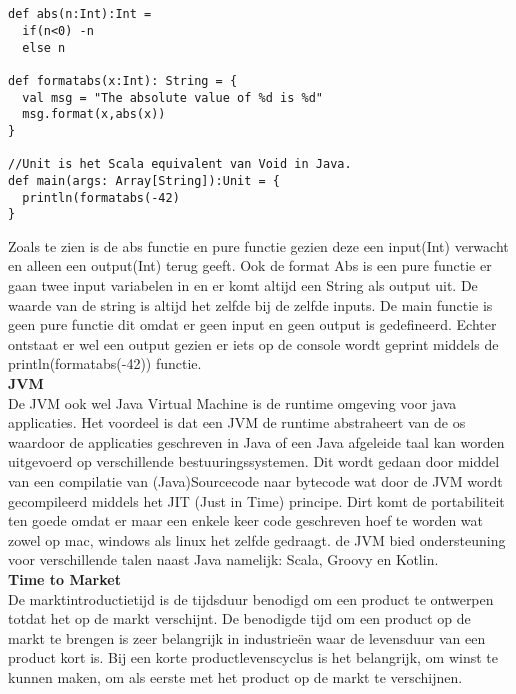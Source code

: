 \begin{lstlisting}[caption={Pure functie met IO},label=lst:pf]


def abs(n:Int):Int =
  if(n<0) -n
  else n

def formatabs(x:Int): String = {
  val msg = "The absolute value of %d is %d"
  msg.format(x,abs(x))
}

//Unit is het Scala equivalent van Void in Java.
def main(args: Array[String]):Unit = {
  println(formatabs(-42)
}
\end{lstlisting}
Zoals te zien is de abs functie en pure functie gezien deze een input(Int) verwacht en alleen een output(Int) terug geeft. Ook de format Abs is een pure functie er gaan twee input variabelen in en er komt altijd een String als output uit. De waarde van de string is altijd het zelfde bij de zelfde inputs. De main functie is geen pure functie dit omdat er geen input en geen output is gedefineerd. Echter ontstaat er wel een output gezien er iets op de console wordt geprint middels de println(formatabs(-42)) functie.\\
\textbf{JVM}\\
De JVM ook wel Java Virtual Machine is de runtime omgeving voor java applicaties. Het voordeel is dat een JVM de runtime abstraheert van de os waardoor de applicaties geschreven in Java of een Java afgeleide taal kan worden uitgevoerd op verschillende bestuuringssystemen. Dit wordt gedaan door middel van een compilatie van (Java)Sourcecode naar bytecode wat door de JVM wordt gecompileerd middels het JIT (Just in Time) principe. Dirt komt de portabiliteit ten goede omdat er maar een enkele keer code geschreven hoef te worden wat zowel op mac, windows als linux het zelfde gedraagt. de JVM bied ondersteuning voor verschillende talen naast Java namelijk: Scala, Groovy en Kotlin.\\
\textbf{Time to Market}\\
De marktintroductietijd is de tijdsduur benodigd om een product te ontwerpen totdat het op de markt verschijnt. De benodigde tijd om een product op de markt te brengen is zeer belangrijk in industrieën waar de levensduur van een product kort is. Bij een korte productlevenscyclus is het belangrijk, om winst te kunnen maken, om als eerste met het product op de markt te verschijnen.\\

